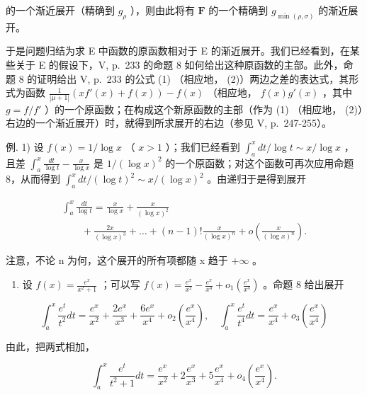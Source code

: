 的一个渐近展开（精确到 \(g_{\rho}\) ），则由此将有 \(\mathbf{F}\) 的一个精确到 \(g_{\min(\rho, \sigma)}\) 的渐近展开。

于是问题归结为求 E 中函数的原函数相对于 E 的渐近展开。我们已经看到，在某些关于 E 的假设下，V, p.~233 的命题 8 如何给出这种原函数的主部。此外，命题 8 的证明给出 V, p.~233 的公式 (1) （相应地， (2)）两边之差的表达式，其形式为函数 \(\frac{1}{|\mu+1|}\left(xf'(x)+f(x)\right)-f(x)\) （相应地， \(f(x)g'(x)\) ，其中 \(g=f/f'\) ）的一个原函数；在构成这个新原函数的主部（作为 (1) （相应地， (2)）右边的一个渐近展开）时，就得到所求展开的右边（参见 V, p.~247-255）。

例. 1) 设 \(f(x) = 1 / \log x\) （ \(x > 1\) ）；我们已经看到 \(\int_{a}^{x} dt / \log t \sim x / \log x\) ，且差 \(\int_{a}^{x} \frac{dt}{\log t} - \frac{x}{\log x}\) 是 \(1 / (\log x)^2\) 的一个原函数；对这个函数可再次应用命题 8，从而得到 \(\int_{a}^{x} dt / (\log t)^2 \sim x / (\log x)^2\) 。由递归于是得到展开

\[
\begin{array}{l} \int_ {a} ^ {x} \frac {d t}{\log t} = \frac {x}{\log x} + \frac {x}{(\log x) ^ {2}} \\ \qquad + \frac {2 x}{(\log x) ^ {3}} + \dots + (n - 1)! \frac {x}{(\log x) ^ {n}} + o \left(\frac {x}{(\log x) ^ {n}}\right). \end{array}
\]

注意，不论 n 为何，这个展开的所有项都随 x 趋于 \(+\infty\) 。

\begin{enumerate}
\def\labelenumi{\arabic{enumi})}
\setcounter{enumi}{1}
\tightlist
\item
  设 \(f(x) = \frac{e^x}{x^2 + 1}\) ；可以写 \(f(x) = \frac{e^x}{x^2} - \frac{e^x}{x^4} + o_1\left(\frac{e^x}{x^4}\right)\) 。命题 8 给出展开
\end{enumerate}

\[
\int_ {a} ^ {x} \frac {e ^ {t}}{t ^ {2}} d t = \frac {e ^ {x}}{x ^ {2}} + \frac {2 e ^ {x}}{x ^ {3}} + \frac {6 e ^ {x}}{x ^ {4}} + o _ {2} \left(\frac {e ^ {x}}{x ^ {4}}\right), \quad \int_ {a} ^ {x} \frac {e ^ {t}}{t ^ {4}} d t = \frac {e ^ {x}}{x ^ {4}} + o _ {3} \left(\frac {e ^ {x}}{x ^ {4}}\right)
\]

由此，把两式相加，

\[
\int_ {a} ^ {x} \frac {e ^ {t}}{t ^ {2} + 1} d t = \frac {e ^ {x}}{x ^ {2}} + 2 \frac {e ^ {x}}{x ^ {3}} + 5 \frac {e ^ {x}}{x ^ {4}} + o _ {4} \left(\frac {e ^ {x}}{x ^ {4}}\right).
\]

